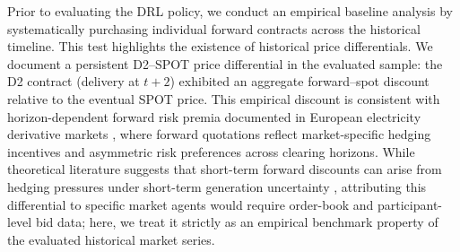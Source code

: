 Prior to evaluating the DRL policy, we conduct an empirical baseline analysis by systematically purchasing individual forward contracts across the historical timeline. This test highlights the existence of historical price differentials. We document a persistent D2--SPOT price differential in the evaluated sample: the D2 contract (delivery at $t+2$) exhibited an aggregate forward--spot discount relative to the eventual SPOT price. This empirical discount is consistent with horizon-dependent forward risk premia documented in European electricity derivative markets \cite{huisman2012electricity, woo2001cross, huisman2009electricity}, where forward quotations reflect market-specific hedging incentives and asymmetric risk preferences across clearing horizons. While theoretical literature suggests that short-term forward discounts can arise from hedging pressures under short-term generation uncertainty \cite{schwenen2024renewable}, attributing this differential to specific market agents would require order-book and participant-level bid data; here, we treat it strictly as an empirical benchmark property of the evaluated historical market series. 

